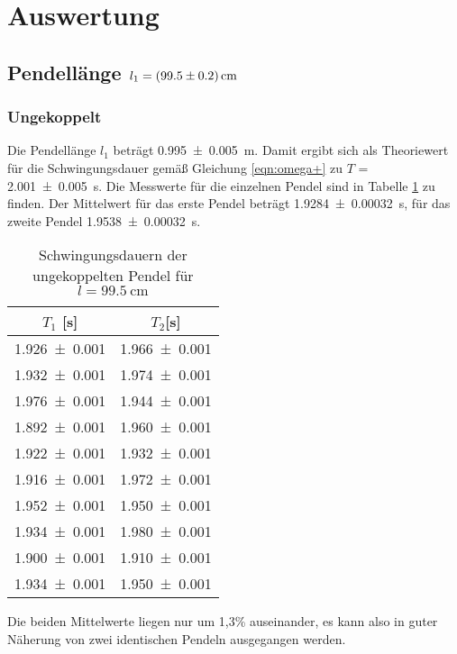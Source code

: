 \section{Auswertung}
\label{sec:Auswertung}
\subsection{Pendellänge $l_1 = \SI{99.5 +- 0.2}{\centi\meter}$}
\subsubsection{Ungekoppelt}
Die Pendellänge $l_1$ beträgt \SI{0.995 +- 0.005}{\meter}. Damit ergibt
sich als Theoriewert für die Schwingungsdauer gemäß Gleichung \ref{eqn:omega+}
zu
$T$ = \SI{2.001 +- 0.005}{\second}. Die Messwerte für die einzelnen Pendel
sind in Tabelle \ref{tab:l1ungekoppelt} zu finden.
Der Mittelwert für das erste Pendel beträgt \SI{1.9284 +- 0.00032}{\second}, für
das zweite Pendel \SI{1.9538 +- 0.00032}{\second}.
\begin{table}[H]
 \centering
 \caption{Schwingungsdauern der ungekoppelten
 Pendel für $l = \SI{99.5}{\centi\meter}$}
 \label{tab:l1ungekoppelt}
 \begin{tabular}{cc}
 \toprule
  {$T_1$ [\si{\second}]} & {$T_2$[\si{\second}]} \\
 \midrule
    \num{1.926 +- 0.001} & \num{1.966 +- 0.001} \\
    \num{1.932 +- 0.001} & \num{1.974 +- 0.001}\\
    \num{1.976 +- 0.001} & \num{1.944 +- 0.001}\\
    \num{1.892 +- 0.001} & \num{1.960 +- 0.001}\\
    \num{1.922 +- 0.001} & \num{1.932 +- 0.001}\\
    \num{1.916 +- 0.001} & \num{1.972 +- 0.001}\\
    \num{1.952 +- 0.001} & \num{1.950 +- 0.001}\\
    \num{1.934 +- 0.001} & \num{1.980 +- 0.001}\\
    \num{1.900 +- 0.001} & \num{1.910 +- 0.001}\\
    \num{1.934 +- 0.001} & \num{1.950 +- 0.001}\\
 \bottomrule
 \end{tabular}
\end{table}
Die beiden Mittelwerte liegen nur um 1,3\% auseinander, es kann also in guter
Näherung von zwei identischen Pendeln ausgegangen werden.

